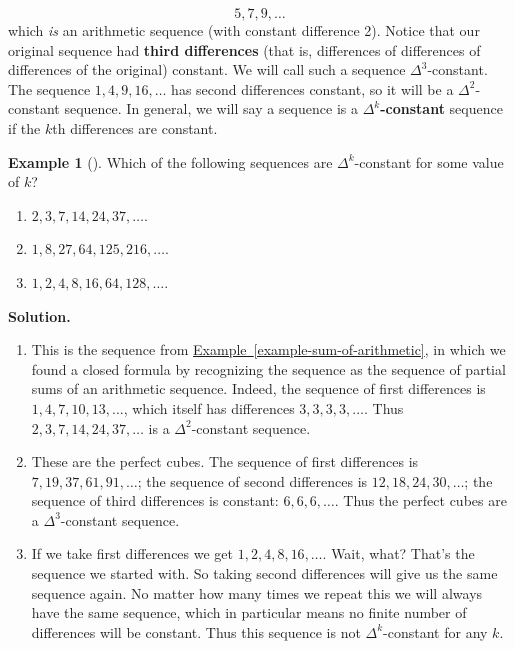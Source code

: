 \documentclass[10pt,]{book}
\newcommand{\terminology}[1]{\textbf{#1}}
\theoremstyle{plain}
\theoremstyle{definition}
\theoremstyle{definition}
\newtheorem{example}[theorem]{Example}
\theoremstyle{definition}
\theoremstyle{definition}
\numberwithin{equation}{chapter}
\begin{document}
\begin{equation*}
5, 7, 9, \ldots
\end{equation*}
which \emph{is} an arithmetic sequence (with constant difference 2). Notice that our original sequence had \terminology{third differences} (that is, differences of differences of differences of the original) constant. We will call such a sequence \(\Delta^3\)-constant. The sequence \(1, 4, 9, 16, \ldots\) has second differences constant, so it will be a \(\Delta^2\)-constant sequence. In general, we will say a sequence is a \terminology{\(\Delta^k\)-constant}\label{notation-4}
 sequence if the \(k\)th differences are constant.%
\begin{example}[]\label{example-deltak}
\hypertarget{p-234}{}%
Which of the following sequences are \(\Delta^k\)-constant for some value of \(k\)? \leavevmode%
\begin{enumerate}
\item\hypertarget{li-153}{}\(2, 3, 7, 14, 24, 37,\ldots\).%
\item\hypertarget{li-154}{}\(1, 8, 27, 64, 125, 216, \ldots\).%
\item\hypertarget{li-155}{}\(1,2,4,8,16,64,128,\ldots\).%
\end{enumerate}
%
\par\smallskip%
\noindent\textbf{Solution.}\hypertarget{solution-25}{}\quad%
\hypertarget{p-235}{}%
\leavevmode%
\begin{enumerate}
\item\hypertarget{li-156}{}This is the sequence from \hyperref[example-sum-of-arithmetic]{Example~\ref{example-sum-of-arithmetic}}, in which we found a closed formula by recognizing the sequence as the sequence of partial sums of an arithmetic sequence. Indeed, the sequence of first differences is \(1,4,7, 10, 13,\ldots\), which itself has differences \(3,3,3,3,\ldots\). Thus \(2, 3, 7, 14, 24, 37,\ldots\) is a \(\Delta^2\)-constant sequence.%
\item\hypertarget{li-157}{}These are the perfect cubes. The sequence of first differences is \(7, 19, 37, 61, 91, \ldots\); the sequence of second differences is \(12, 18, 24, 30,\ldots\); the sequence of third differences is constant: \(6,6,6,\ldots\). Thus the perfect cubes are a \(\Delta^3\)-constant sequence.%
\item\hypertarget{li-158}{}If we take first differences we get \(1,2,4,8,16,\ldots\). Wait, what? That's the sequence we started with. So taking second differences will give us the same sequence again. No matter how many times we repeat this we will always have the same sequence, which in particular means no finite number of differences will be constant. Thus this sequence is not \(\Delta^k\)-constant for any \(k\).%
\end{enumerate}
%
\end{example}
\end{document}
